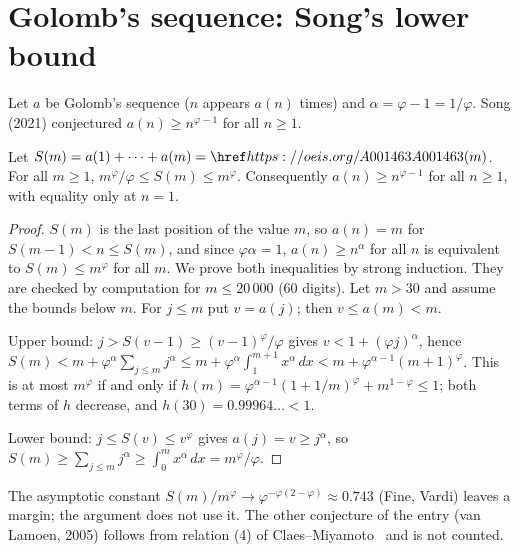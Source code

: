 \section{Golomb's sequence: Song's lower bound}\label{s:A001462}
Let $a$ be Golomb's sequence ($n$ appears $a(n)$ times) and $\alpha=\varphi-1=1/\varphi$. Song (2021)
conjectured $a(n)\ge n^{\varphi-1}$ for all $n\ge1$.
\begin{theorem}\label{t:A001462} Let $S(m)=a(1)+\dots+a(m)=\oeis{A001463}(m)$. For all $m\ge1$,
$m^\varphi/\varphi\le S(m)\le m^\varphi$. Consequently $a(n)\ge n^{\varphi-1}$ for all $n\ge1$, with equality only
at $n=1$.\end{theorem}
\begin{proof} $S(m)$ is the last position of the value $m$, so $a(n)=m$ for $S(m-1)<n\le S(m)$, and since
$\varphi\alpha=1$, $a(n)\ge n^\alpha$ for all $n$ is equivalent to $S(m)\le m^\varphi$ for all $m$. We prove both
inequalities by strong induction. They are checked by computation for $m\le20\,000$ (60 digits). Let $m>30$
and assume the bounds below $m$. For $j\le m$ put $v=a(j)$; then $v\le a(m)<m$.

Upper bound: $j>S(v-1)\ge(v-1)^\varphi/\varphi$ gives $v<1+(\varphi j)^\alpha$, hence
$S(m)<m+\varphi^\alpha\sum_{j\le m}j^\alpha\le m+\varphi^\alpha\int_1^{m+1}x^\alpha\,dx<m+\varphi^{\alpha-1}(m+1)^\varphi$.
This is at most $m^\varphi$ if and only if $h(m)=\varphi^{\alpha-1}(1+1/m)^\varphi+m^{1-\varphi}\le1$; both terms of
$h$ decrease, and $h(30)=0.99964\ldots<1$.

Lower bound: $j\le S(v)\le v^\varphi$ gives $a(j)=v\ge j^\alpha$, so
$S(m)\ge\sum_{j\le m}j^\alpha\ge\int_0^mx^\alpha\,dx=m^\varphi/\varphi$. \end{proof}
The asymptotic constant $S(m)/m^\varphi\to\varphi^{-\varphi(2-\varphi)}\approx0.743$ (Fine, Vardi) leaves a margin;
the argument does not use it. The other conjecture of the entry (van Lamoen, 2005) follows from relation (4)
of Claes--Miyamoto~\cite{CM} and is not counted.

